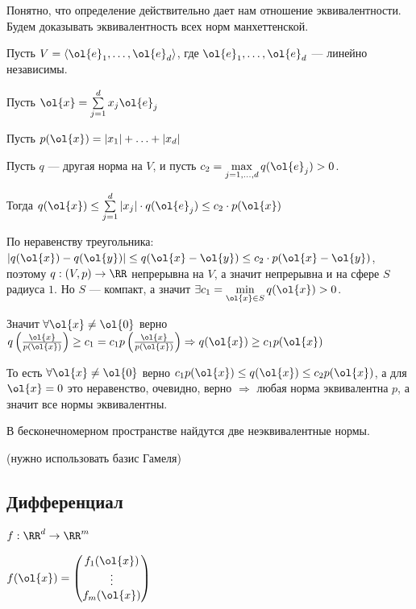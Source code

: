 Понятно, что определение действительно дает нам отношение эквивалентности.
Будем доказывать эквивалентность всех норм манхеттенской.

Пусть \( V = \langle \ol{e}_1, \ldots, \ol{e}_d \rangle \),
где \( \ol{e}_1, \ldots, \ol{e}_d \) --- линейно независимы.

Пусть \( \ol{x} = \sum\limits_{j = 1}^d x_j \ol{e}_j \)

Пусть \( p(\ol{x}) = |x_1| + \ldots + |x_d| \)

Пусть \( q \) --- другая норма на \( V \), и пусть \( c_2 = \max\limits_{j = 1, \ldots, d} q(\ol{e}_j) > 0 \).

Тогда \( q(\ol{x}) \leq \sum\limits_{j = 1}^{d} |x_j| \cdot q(\ol{e}_j) \leq c_2 \cdot p(\ol{x}) \)

По неравенству треугольника:
\( | q(\ol{x}) - q(\ol{y}) | \leq q(\ol{x} - \ol{y}) \leq c_2 \cdot p(\ol{x} - \ol{y}) \),
поэтому \( q : (V, p) \to \RR \) непрерывна на \( V \),
а значит непрерывна и на сфере \( S \) радиуса \( 1 \).
Но \( S \) --- компакт, а значит \( \exists c_1 = \min\limits_{\ol{x} \in S} q(\ol{x}) > 0 \).

Значит \( \forall \ol{x} \neq \ol{0} \) верно
\(
    q \left( \frac{\ol{x}}{p(\ol{x})} \right) \geq c_1 = c_1 p \left( \frac{\ol{x}}{p(\ol{x})} \right)
    \Rightarrow
    q ( \ol{x} ) \geq c_1 p ( \ol{x} )
\)

То есть \( \forall \ol{x} \neq \ol{0} \) верно \( c_1 p(\ol{x}) \leq q(\ol{x}) \leq c_2 p(\ol{x}) \),
а для \( \ol{x} = 0 \) это неравенство, очевидно, верно \( \Rightarrow \)
любая норма эквивалентна \( p \), а значит все нормы эквивалентны.

\begin{exercise}{}{}
    В бесконечномерном пространстве найдутся две неэквивалентные нормы.

    (нужно использовать базис Гамеля)
\end{exercise}

\newpage

\subsection{Дифференциал}

\( f : \RR^d \to \RR^m \)

\(
    f(\ol{x}) = \begin{pmatrix}
        f_1 (\ol{x})
        \\
        \vdots
        \\
        f_m (\ol{x})
    \end{pmatrix}
\)

